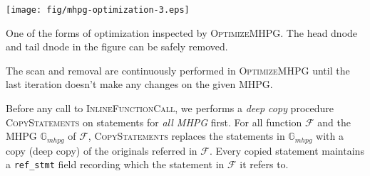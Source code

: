 \begin{center-figure}
	\texttt{[image: fig/mhpg-optimization-3.eps]}
	\caption[One of the forms of optimization inspected by \textsc{OptimizeMHPG}]{One of the forms of optimization inspected by \textsc{OptimizeMHPG}. The  head dnode and  tail dnode in the figure can be safely removed.}
	\label{fig:MHPG_Optimization_3}
\end{center-figure}

The scan and removal are continuously performed in \textsc{OptimizeMHPG} until the last iteration doesn't make any changes on the given MHPG.

\label{l:CopyStatements}
Before any call to \textsc{InlineFunctionCall}, we performs a \textit{deep copy} procedure \textsc{CopyStatements} on statements for \textit{all MHPG} first. For all function $\mathcal{F}$ and the MHPG $\mathbb{G}_{mhpg}$ of $\mathcal{F}$, \textsc{CopyStatements} replaces the statements in $\mathbb{G}_{mhpg}$ with a copy (deep copy) of the originals referred in $\mathcal{F}$. Every copied statement maintains a \verb|ref_stmt| field recording which the statement in $\mathcal{F}$ it refers to.

